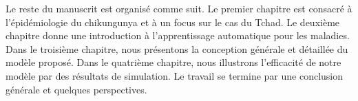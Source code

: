 Le reste du manuscrit est organisé comme suit. Le premier chapitre est consacré à l'épidémiologie du chikungunya et à un focus sur le cas du Tchad. Le deuxième chapitre donne une introduction à l'apprentissage automatique pour les maladies. Dans le troisième chapitre, nous présentons la conception générale et détaillée du modèle proposé. Dans le quatrième chapitre, nous illustrons l'efficacité de notre modèle par des résultats de simulation. Le travail se termine par une conclusion générale et quelques perspectives.

